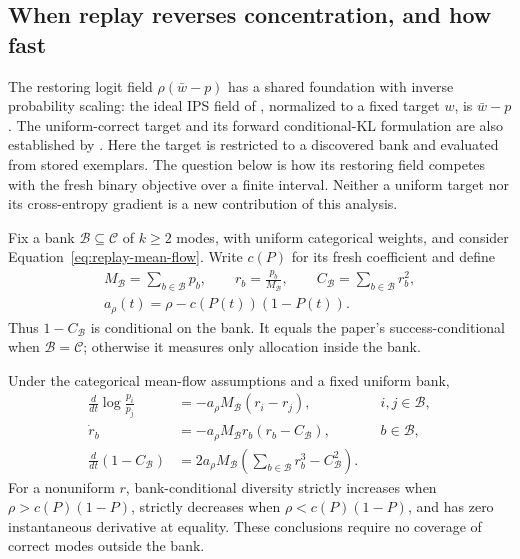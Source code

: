 \subsection{When replay reverses concentration, and how fast}
\label{app:theory-replay-finite-horizon}

The restoring logit field $\rho(\bar w-p)$ has a shared foundation with
inverse probability scaling: the ideal IPS field of
\citet[Theorem~4.1]{sinha2026expected}, normalized to a fixed target $w$, is
$\bar w-p$. The uniform-correct target and its forward conditional-KL
formulation are also established by \citet{lochab2026ucpo}. Here the target is
restricted to a discovered bank and evaluated from stored exemplars. The
question below is how its restoring field competes with the fresh binary
objective over a finite interval. Neither a uniform target nor its
cross-entropy gradient is a new contribution of this analysis.

Fix a bank $\mathcal B\subseteq\mathcal C$ of $k\ge2$ modes, with uniform
categorical weights, and consider Equation~\eqref{eq:replay-mean-flow}.
Write $c(P)$ for its fresh coefficient and define
\begin{equation}
 \begin{gathered}
 M_{\mathcal B}=\sum_{b\in\mathcal B}p_b,\qquad
 r_b=\frac{p_b}{M_{\mathcal B}},\qquad
 C_{\mathcal B}=\sum_{b\in\mathcal B}r_b^2,\\
 a_\rho(t)=\rho-c(P(t))(1-P(t)).
 \end{gathered}
 \label{eq:replay-finite-notation}
\end{equation}
Thus $1-C_{\mathcal B}$ is \pmd{} conditional on the bank. It equals the
paper's success-conditional \pmd{} when $\mathcal B=\mathcal C$; otherwise
it measures only allocation inside the bank.

\begin{theorem}
\label{thm:replay-finite-threshold}
Under the categorical mean-flow assumptions and a fixed uniform bank,
\begin{align}
 \frac{d}{dt}\log\frac{p_i}{p_j}
  &=-a_\rho M_{\mathcal B}(r_i-r_j),
   &&i,j\in\mathcal B,\label{eq:replay-finite-ratio}\\
 \dot r_b&=-a_\rho M_{\mathcal B}r_b(r_b-C_{\mathcal B}),
   &&b\in\mathcal B,\label{eq:replay-finite-conditional}\\
 \frac{d}{dt}(1-C_{\mathcal B})
  &=2a_\rho M_{\mathcal B}
    \left(\sum_{b\in\mathcal B}r_b^3-C_{\mathcal B}^2\right).
 \label{eq:replay-finite-pcmd}
\end{align}
For a nonuniform $r$, bank-conditional diversity strictly increases when
$\rho>c(P)(1-P)$, strictly decreases when $\rho<c(P)(1-P)$, and has zero
instantaneous derivative at equality. These conclusions require no coverage
of correct modes outside the bank.
\end{theorem}

